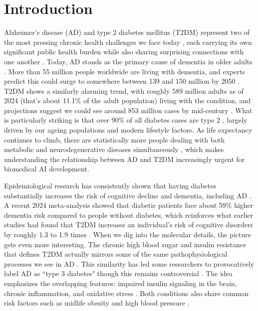 \section{Introduction}
Alzheimer's disease (AD) and type 2 diabetes mellitus (T2DM) represent two of the most pressing chronic health challenges we face today \cite{vb2025global, lopez2024recent}, each carrying its own significant public health burden while also sharing surprising connections with one another \cite{a2014linking}. Today, AD stands as the primary cause of dementia in older adults \cite{alzheimer20152015, mezey2000advance}. More than 55 million people worldwide are living with dementia, and experts predict this could surge to somewhere between 139 and 150 million by 2050 \cite{schwarzinger2022forecasting, logroscino2020prevention}. T2DM shows a similarly alarming trend, with roughly 589 million adults as of 2024 (that's about 11.1\% of the adult population) living with the condition, and projections suggest we could see around 853 million cases by mid-century \cite{kalyani2025diagnosis}. What is particularly striking is that over 90\% of all diabetes cases are type 2 \cite{kalyani2025diagnosis, zheng2018global}, largely driven by our ageing populations and modern lifestyle factors. As life expectancy continues to climb, there are statistically more people dealing with both metabolic and neurodegenerative diseases simultaneously \cite{procaccini2016role}, which makes understanding the relationship between AD and T2DM increasingly urgent for biomedical AI development.

 Epidemiological research has consistently shown that having diabetes substantially increases the risk of cognitive decline and dementia, including AD \cite{barbagallo2014type}. A recent 2024 meta-analysis showed that diabetic patients face about 59\% higher dementia risk compared to people without diabetes\cite{barbagallo2014type, bellia2022diabetes}, which reinforces what earlier studies had found that T2DM increases an individual's risk of cognitive disorders by roughly 1.3 to 1.9 times \cite{kciuk2024alzheimer}. When we dig into the molecular details, the picture gets even more interesting. The chronic high blood sugar and insulin resistance that defines T2DM actually mirrors some of the same pathophysiological processes we see in AD \cite{blazquez2014insulin}. This similarity has led some researchers to provocatively label AD as ``type 3 diabetes" though this remains controversial \cite{abdelgadir2017effect, de2014type, kroner2009relationship, leszek2017type}. The idea emphasizes the overlapping features: impaired insulin signaling in the brain, chronic inflammation, and oxidative stress \cite{kciuk2024alzheimer}. Both conditions also share common risk factors such as midlife obesity and high blood pressure \cite{kciuk2024alzheimer}.

